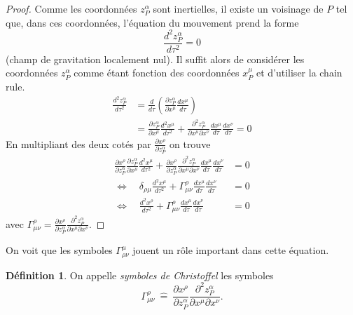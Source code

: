 \documentclass[a4paper,11pt]{report}
\theoremstyle{definition}
\theoremstyle{plain}
\theoremstyle{definition}
\newtheorem{defn}{Définition}[chapter]
\theoremstyle{remark}
\newcommand{\p}{\partial}
\begin{document}
            \begin{proof}
                Comme les coordonnées $z^\alpha_P$ sont inertielles, il existe un voisinage de $P$ tel que, dans ces coordonnées, l'équation du mouvement prend la forme
                \begin{equation}
                    \frac{d^2 z^\alpha_P}{d\tau^2} = 0
                \end{equation}
                (champ de gravitation localement nul). Il suffit alors de considérer les coordonnées $z^\alpha_P$ comme étant fonction des coordonnées $x^\mu_P$ et d'utiliser la chain rule.
                \begin{align}
                    \frac{d^2 z^\alpha_P}{d\tau^2} &= \frac{d}{d\tau}\left( \frac{\p z^\alpha_P}{\p x^\mu}\frac{dx^\mu}{d\tau} \right) \\
                    &= \frac{\p z^\alpha_P}{\p x^\mu}\frac{d^2x^\mu}{d\tau^2}+\frac{\p^2 z^\alpha_P}{\p x^\mu\p x^\nu}\frac{dx^\mu}{d\tau}\frac{dx^\nu}{d\tau} = 0
                \end{align}
                En multipliant des deux cotés par $\frac{\p x^\rho}{\p z^\alpha_P}$ on trouve
                \begin{align}
                    \frac{\p x^\rho}{\p z^\alpha_P}\frac{\p z^\alpha_P}{\p x^\mu}\frac{d^2x^\mu}{d\tau^2}+\frac{\p x^\rho}{\p z^\alpha_P}\frac{\p^2 z^\alpha_P}{\p x^\mu\p x^\nu}\frac{dx^\mu}{d\tau}\frac{dx^\nu}{d\tau} &= 0 \\
                    \Leftrightarrow\quad \delta_{\rho\mu}\frac{d^2x^\mu}{d\tau^2}+\Gamma^\rho_{\mu\nu}\frac{dx^\mu}{d\tau}\frac{dx^\nu}{d\tau} &= 0 \\
                    \Leftrightarrow\quad \frac{d^2x^\rho}{d\tau^2}+\Gamma^\rho_{\mu\nu}\frac{dx^\mu}{d\tau}\frac{dx^\nu}{d\tau} &= 0 
                \end{align}
                avec $\Gamma^\rho_{\mu\nu} = \frac{\p x^\rho}{\p z^\alpha_P}\frac{\p^2 z^\alpha_P}{\p x^\mu\p x^\nu}$.
            \end{proof}
            
            On voit que les symboles $\Gamma^\mu_{\rho\nu}$ jouent un rôle important dans cette équation.
            
            \begin{defn}
                On appelle \textit{symboles de Christoffel} les symboles
                \begin{equation}
                    \Gamma^\rho_{\mu\nu} ~\hat{=}~ \frac{\p x^\rho}{\p z^\alpha_P}\frac{\p^2 z^\alpha_P}{\p x^\mu\p x^\nu}.
                \end{equation}
            \end{defn}
            
\end{document}
